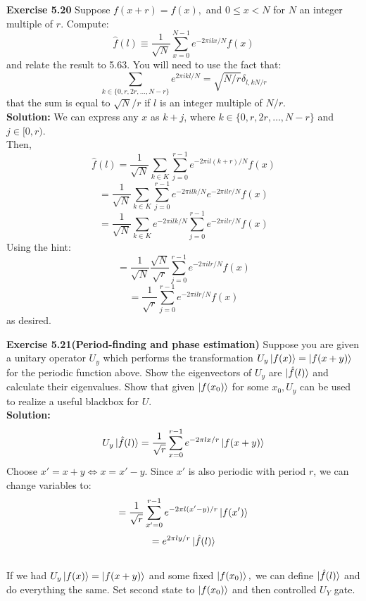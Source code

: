 \documentclass{article}
\begin{document}
\begin{tcolorbox}\textbf{Exercise 5.20} Suppose $f(x+r) = f(x),$ and $0 \leq x < N$ for $N$ an integer multiple of $r$. Compute:
	$$\hat{f}(l) \equiv \frac{1}{\sqrt{N}} \sum_{x=0}^{N-1} e^{-2\pi ilx/N}f(x)$$ and relate the result to 5.63.
		You will need to use the fact that:
		$$\sum_{k \in \{0,r,2r, \dots, N-r\}} e^{2\pi ikl/N} = \sqrt{N/r} \delta_{l, kN/r}$$
		that the sum is equal to $\sqrt{N}/r$ if $l$ is an integer multiple of $N/r$.\\
		\textbf{Solution:}
		We can express any $x$ as $k+j$, where $k \in \{0,r,2r,\dots, N-r\}$ and $j \in [0, r)$.\\
		Then,
		$$\hat{f}(l) = \frac{1}{\sqrt{N}} \sum_{k \in K} \sum_{j=0}^{r-1} e^{-2\pi il(k+r)/N} f(x)$$
		$$= \frac{1}{\sqrt{N}} \sum_{k \in K} \sum_{j=0}^{r-1} e^{-2\pi ilk/N}  e^{-2\pi ilr/N} f(x) $$
		$$= \frac{1}{\sqrt{N}} \sum_{k \in K}  e^{-2\pi ilk/N}   \sum_{j=0}^{r-1}e^{-2\pi ilr/N} f(x) $$
Using the hint:	
$$= \frac{1}{\sqrt{N}} \frac{\sqrt{N}}{\sqrt{r}} \sum_{j=0}^{r-1}e^{-2\pi ilr/N} f(x) $$
$$= \frac{1}{\sqrt{r}} \sum_{j=0}^{r-1}e^{-2\pi ilr/N} f(x) $$
as desired.
\end{tcolorbox}
\begin{tcolorbox}\textbf{Exercise 5.21(Period-finding and phase estimation)} Suppose you are given a unitary operator $U_y$ which performs the transformation $U_y \ket{f(x)} = \ket{f(x+y)}$ for the periodic function above. Show the eigenvectors of $U_y$ are $\ket{\hat{f}(l)}$ and calculate their eigenvalues. Show that given $\ket{f(x_0)}$ for some $x_0, U_y$ can be used to realize a useful blackbox for $U$.\\
	\textbf{Solution:}\\
	$$U_y \ket{\hat{f}(l)} = \frac{1}{\sqrt{r}} \sum^{r-1}_{x=0} e^{-2\pi lx/r} \ket{f(x+y)}$$
Choose $x'=x+y \iff x=x'-y$. Since $x'$ is also periodic with period $r$, we can change variables to:
$$ = \frac{1}{\sqrt{r}} \sum^{r-1}_{x'=0} e^{-2\pi l(x'-y)/r} \ket{f(x')}$$
$$= e^{2\pi l y/r} \ket{\hat{f}(l)}$$\\
If we had $U_y \ket{f(x)} = \ket{f(x+y)}$ and some fixed $\ket{f(x_0)}, $ we can define $\ket{\hat{f}(l)}$ and do everything the same. Set second state to $\ket{f(x_0)}$ and then controlled $U_Y$ gate.
\end{tcolorbox}
\end{document}
